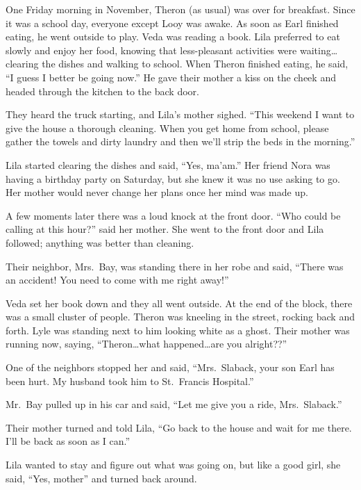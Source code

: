 \documentclass[
  american,
  letterpaper,
]{book}
\begin{document}
One Friday morning in November, Theron (as usual) was over for
breakfast. Since it was a school day, everyone except Looy was awake. As
soon as Earl finished eating, he went outside to play. Veda was reading
a book. Lila preferred to eat slowly and enjoy her food, knowing that
less-pleasant activities were waiting\ldots clearing the dishes and
walking to school. When Theron finished eating, he said, ``I guess I
better be going now.'' He gave their mother a kiss on the cheek and
headed through the kitchen to the back door.

They heard the truck starting, and Lila's mother sighed. ``This weekend
I want to give the house a thorough cleaning. When you get home from
school, please gather the towels and dirty laundry and then we'll strip
the beds in the morning.''

Lila started clearing the dishes and said, ``Yes, ma'am.'' Her friend
Nora was having a birthday party on Saturday, but she knew it was no use
asking to go. Her mother would never change her plans once her mind was
made up.

A few moments later there was a loud knock at the front door. ``Who
could be calling at this hour?'' said her mother. She went to the front
door and Lila followed; anything was better than cleaning.

Their neighbor, Mrs.~Bay, was standing there in her robe and said,
``There was an accident! You need to come with me right away!''

Veda set her book down and they all went outside. At the end of the
block, there was a small cluster of people. Theron was kneeling in the
street, rocking back and forth. Lyle was standing next to him looking
white as a ghost. Their mother was running now, saying,
``Theron\ldots what happened\ldots are you alright??''

One of the neighbors stopped her and said, ``Mrs.~Slaback, your son Earl
has been hurt. My husband took him to St.~Francis Hospital.''

Mr.~Bay pulled up in his car and said, ``Let me give you a ride,
Mrs.~Slaback.''

Their mother turned and told Lila, ``Go back to the house and wait for
me there. I'll be back as soon as I can.''

Lila wanted to stay and figure out what was going on, but like a good
girl, she said, ``Yes, mother'' and turned back around.
\end{document}
